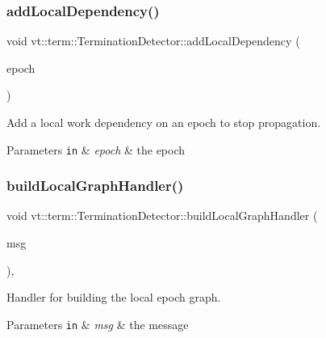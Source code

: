 \subsubsection{\texorpdfstring{add\+Local\+Dependency()}{addLocalDependency()}}
{\footnotesize\ttfamily void vt\+::term\+::\+Termination\+Detector\+::add\+Local\+Dependency (\begin{DoxyParamCaption}\item[{\hyperlink{namespacevt_a81d11b28122d43bf9834577e4a06440f}{Epoch\+Type}}]{epoch }\end{DoxyParamCaption})}



Add a local work dependency on an epoch to stop propagation. 


\begin{DoxyParams}[1]{Parameters}
\mbox{\tt in}  & {\em epoch} & the epoch \\
\hline
\end{DoxyParams}
\mbox{\label{structvt_1_1term_1_1_termination_detector_adb3b87cb03a5991e059bb7930ec5d682}} 
\subsubsection{\texorpdfstring{build\+Local\+Graph\+Handler()}{buildLocalGraphHandler()}}
{\footnotesize\ttfamily void vt\+::term\+::\+Termination\+Detector\+::build\+Local\+Graph\+Handler (\begin{DoxyParamCaption}\item[{\hyperlink{structvt_1_1term_1_1_build_graph_msg}{Build\+Graph\+Msg} $\ast$}]{msg }\end{DoxyParamCaption})\hspace{0.3cm}{\ttfamily [static]}, {\ttfamily [private]}}



Handler for building the local epoch graph. 


\begin{DoxyParams}[1]{Parameters}
\mbox{\tt in}  & {\em msg} & the message \\
\hline
\end{DoxyParams}
\mbox{\label{structvt_1_1term_1_1_termination_detector_a40a2ebe4e220dace273cc6570dd70b01}} 

